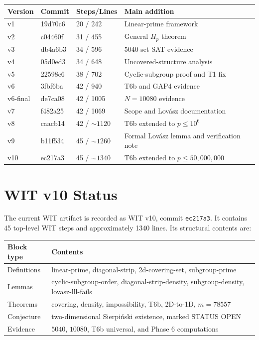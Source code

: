 \documentclass[11pt]{article}
\theoremstyle{definition}
\theoremstyle{remark}
\begin{document}
\begin{center}
\begin{tabular}{llll}
\hline
Version & Commit & Steps/Lines & Main addition \\
\hline
v1 & 19d70c6 & 20 / 242 & Linear-prime framework \\
v2 & c04460f & 31 / 455 & General \(H_p\) theorem \\
v3 & db4a6b3 & 34 / 596 & \(5040\)-set SAT evidence \\
v4 & 05d0ed3 & 34 / 648 & Uncovered-structure analysis \\
v5 & 22598e6 & 38 / 702 & Cyclic-subgroup proof and T1 fix \\
v6 & 3fbf6ba & 42 / 940 & T6b and GAP4 evidence \\
v6-final & de7ca08 & 42 / 1005 & \(N=10080\) evidence \\
v7 & f482a25 & 42 / 1069 & Scope and Lov\'asz documentation \\
v8 & caacb14 & 42 / \(\sim1120\) & T6b extended to \(p\leq 10^6\) \\
v9 & b11f534 & 45 / \(\sim1260\) & Formal Lov\'asz lemma and verification note \\
v10 & ec217a3 & 45 / \(\sim1340\) & T6b extended to \(p\leq 50{,}000{,}000\) \\
\hline
\end{tabular}
\end{center}

\section{WIT v10 Status}

The current WIT artifact is recorded as WIT v10, commit \texttt{ec217a3}.
It contains 45 top-level WIT steps and approximately 1340 lines.  Its structural
contents are:

\begin{center}
\begin{tabular}{ll}
\hline
Block type & Contents \\
\hline
Definitions & linear-prime, diagonal-strip, 2d-covering-set, subgroup-prime \\
Lemmas & cyclic-subgroup-order, diagonal-strip-density, subgroup-density, lovasz-lll-fails \\
Theorems & covering, density, impossibility, T6b, 2D-to-1D, \(m=78557\) \\
Conjecture & two-dimensional Sierpi\'nski existence, marked STATUS OPEN \\
Evidence & \(5040\), \(10080\), T6b universal, and Phase 6 computations \\
\hline
\end{tabular}
\end{center}
\end{document}
